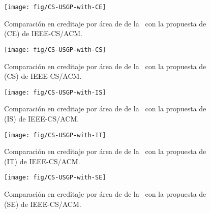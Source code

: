 \begin{figure}[h!]
\centering
	\texttt{[image: fig/CS-USGP-with-CE]}
	\caption{Comparación en creditaje por área de \SchoolShortName de la \siglas~con la propuesta de  (CE) de IEEE-CS/ACM.}
	\label{fig:comparing-CS-USGP-with-CE}
\end{figure}

\begin{figure}[h!]
\centering
	\texttt{[image: fig/CS-USGP-with-CS]}
	\caption{Comparación en creditaje por área de \SchoolShortName de la \siglas~con la propuesta de  (CS) de IEEE-CS/ACM.}
	\label{fig:comparing-CS-USGP-with-CS}
\end{figure}

\begin{figure}[h!]
\centering
	\texttt{[image: fig/CS-USGP-with-IS]}
	\caption{Comparación en creditaje por área de \SchoolShortName de la \siglas~con la propuesta de  (IS) de IEEE-CS/ACM.}
	\label{fig:comparing-CS-USGP-with-IS}
\end{figure}

\begin{figure}[h!]
\centering
	\texttt{[image: fig/CS-USGP-with-IT]}
	\caption{Comparación en creditaje por área de \SchoolShortName de la \siglas~con la propuesta de  (IT) de IEEE-CS/ACM.}
	\label{fig:comparing-CS-USGP-with-IT}
\end{figure}

\begin{figure}[h!]
\centering
	\texttt{[image: fig/CS-USGP-with-SE]}
	\caption{Comparación en creditaje por área de \SchoolShortName de la \siglas~con la propuesta de  (SE) de IEEE-CS/ACM.}
	\label{fig:comparing-CS-USGP-with-SE}
\end{figure}

